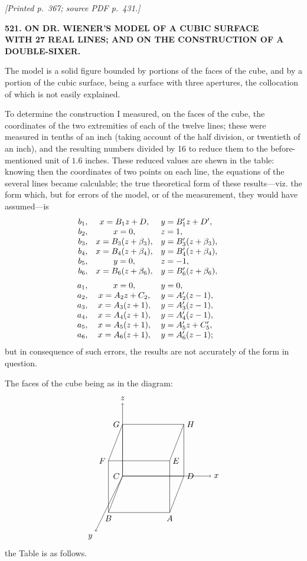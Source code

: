 \documentclass[11pt,a4paper]{article}
\newcommand{\sourcepage}[2]{\par\smallskip\noindent\textit{[Printed p.~#1; source PDF p.~#2.]}\par\smallskip}
\begin{document}
\sourcepage{367}{431}
\begin{center}
{\large\bfseries 521. ON DR. WIENER'S MODEL OF A CUBIC SURFACE}\\
\smallskip
{\large\bfseries WITH 27 REAL LINES; AND ON THE CONSTRUCTION OF A DOUBLE-SIXER.}
\end{center}

The model is a solid figure bounded by portions of the faces of the cube, and
by a portion of the cubic surface, being a surface with three apertures, the collocation
of which is not easily explained.

To determine the construction I measured, on the faces of the cube, the coordinates
of the two extremities of each of the twelve lines; these were measured in tenths
of an inch (taking account of the half division, or twentieth of an inch), and the
resulting numbers divided by 16 to reduce them to the before-mentioned unit of
$1.6$ inches. These reduced values are shewn in the table: knowing then the
coordinates of two points on each line, the equations of the several lines became
calculable; the true theoretical form of these results---viz. the form which, but for
errors of the model, or of the measurement, they would have assumed---is
\[
\begin{array}{rcl@{\qquad}rcl}
b_1, & x=B_1z+D,       & y=B_1'z+D',\\
b_2, & x=0,            & z=1,\\
b_3, & x=B_3(z+\beta_3), & y=B_3'(z+\beta_3),\\
b_4, & x=B_4(z+\beta_4), & y=B_4'(z+\beta_4),\\
b_5, & y=0,            & z=-1,\\
b_6, & x=B_6(z+\beta_6), & y=B_6'(z+\beta_6),\\[2mm]
a_1, & x=0,            & y=0,\\
a_2, & x=A_2z+C_2,     & y=A_2'(z-1),\\
a_3, & x=A_3(z+1),     & y=A_3'(z-1),\\
a_4, & x=A_4(z+1),     & y=A_4'(z-1),\\
a_5, & x=A_5(z+1),     & y=A_5'z+C_5',\\
a_6, & x=A_6(z+1),     & y=A_6'(z-1);
\end{array}
\]
but in consequence of such errors, the results are not accurately of the form in
question.

The faces of the cube being as in the diagram:
\[
\begin{tikzpicture}[scale=1.0,baseline=(current bounding box.center)]
  \coordinate (B) at (0,0);
  \coordinate (A) at (2.6,0);
  \coordinate (D) at (3.2,1.55);
  \coordinate (C) at (0.6,1.55);
  \coordinate (F) at (0,2.2);
  \coordinate (E) at (2.6,2.2);
  \coordinate (H) at (3.2,3.75);
  \coordinate (G) at (0.6,3.75);
  \draw (B)--(A)--(D)--(C)--cycle;
  \draw (F)--(E)--(H)--(G)--cycle;
  \draw (A)--(E) (B)--(F) (C)--(G) (D)--(H);
  \draw[->] (C)--(0.6,4.65) node[above] {$z$};
  \draw[->] (C)--(4.35,1.55) node[right] {$x$};
  \draw[->] (C)--(-0.55,-0.8) node[below left] {$y$};
  \foreach \p/\pos in {A/below,B/below,C/left,D/right,E/right,F/left,G/left,H/right}
    \node[\pos] at (\p) {$\p$};
\end{tikzpicture}
\]
the Table is as follows.
\end{document}
